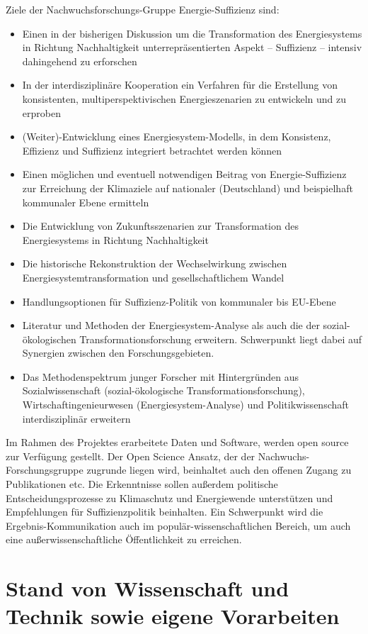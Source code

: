 \documentclass[a4paper,11pt,twoside]{scrartcl}
\begin{document}
Ziele der Nachwuchsforschungs-Gruppe Energie-Suffizienz sind:
\begin{itemize}
 \item Einen in der bisherigen Diskussion um die Transformation des Energiesystems in Richtung Nachhaltigkeit unterrepräsentierten Aspekt  -- Suffizienz -- intensiv dahingehend zu erforschen
  \item In der interdisziplinäre Kooperation ein Verfahren für die Erstellung von konsistenten, multiperspektivischen  Energieszenarien zu entwickeln und zu erproben
  \item (Weiter)-Entwicklung eines Energiesystem-Modells, in dem Konsistenz, Effizienz und Suffizienz integriert betrachtet werden können
 \item Einen möglichen und eventuell notwendigen Beitrag von Energie-Suffizienz zur Erreichung der Klimaziele auf nationaler (Deutschland) und beispielhaft kommunaler Ebene ermitteln
 \item Die Entwicklung von Zukunftsszenarien zur Transformation des Energiesystems in Richtung Nachhaltigkeit 
 \item Die historische Rekonstruktion der Wechselwirkung zwischen Energiesystemtransformation und gesellschaftlichem Wandel  
 \item Handlungsoptionen für Suffizienz-Politik von kommunaler bis EU-Ebene
 \item Literatur und Methoden der Energiesystem-Analyse als auch die der sozial-ökologischen Transformationsforschung erweitern. Schwerpunkt liegt dabei auf Synergien zwischen den Forschungsgebieten.
 \item Das Methodenspektrum junger Forscher mit Hintergründen aus Sozialwissenschaft (sozial-ökologische Transformationsforschung), Wirtschaftingenieurwesen (Energiesystem-Analyse) und Politikwissenschaft interdisziplinär erweitern
\end{itemize}

Im Rahmen des Projektes erarbeitete Daten und Software, werden open source zur Verfügung gestellt. Der Open Science Ansatz, der der Nachwuchs-Forschungsgruppe zugrunde liegen wird, beinhaltet auch den offenen Zugang zu Publikationen etc. Die Erkenntnisse sollen außerdem politische Entscheidungsprozesse zu Klimaschutz und Energiewende unterstützen und Empfehlungen für Suffizienzpolitik beinhalten. Ein Schwerpunkt wird die Ergebnis-Kommunikation auch im populär-wissenschaftlichen Bereich, um auch eine außerwissenschaftliche Öffentlichkeit zu erreichen.

\section{Stand von Wissenschaft und Technik sowie eigene Vorarbeiten}
\end{document}

